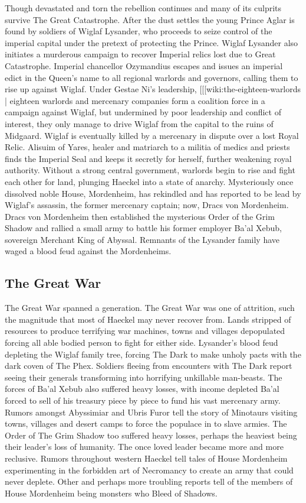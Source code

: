 \begin{multicols}{2}
Though devastated and torn the rebellion continues and many of its culprits survive The Great Catastrophe. After the dust settles the young Prince Aglar is found by soldiers of Wiglaf Lysander, who proceeds to seize control of the imperial capital under the pretext of protecting the Prince. Wiglaf Lysander also initiates a murderous campaign to recover Imperial relics lost due to Great Catastrophe. Imperial chancellor Ozymandius escapes and issues an imperial edict in the Queen's name to all regional warlords and governors, calling them to rise up against Wiglaf. Under Gestae Ni's leadership, [[[wiki:the-eighteen-warlords | eighteen warlords and mercenary companies form a coalition force in a campaign against Wiglaf, but undermined by poor leadership and conflict of interest, they only manage to drive Wiglaf from the capital to the ruins of Midgaard. Wiglaf is eventually killed by a mercenary in dispute over a lost Royal Relic. Alisuim of Yares, healer and matriarch to a militia of medics and priests finds the Imperial Seal and keeps it secretly for herself, further weakening royal authority. Without a strong central government, warlords begin to rise and fight each other for land, plunging Haeckel into a state of anarchy. Mysteriously once dissolved noble House, Mordenheim, has rekindled and has reported to be lead by Wiglaf's assassin, the former mercenary captain; now, Dracs von Mordenheim. Dracs von Mordenheim then established the mysterious Order of the Grim Shadow and rallied a small army to battle his former employer Ba'al Xebub, sovereign Merchant King of Abyssal. Remnants of the Lysander family have waged a blood feud against the Mordenheims.

\subsection{The Great War} The Great War spanned a generation. The Great War was one of attrition, such the magnitude that most of Haeckel may never recover from. Lands stripped of resources to produce terrifying war machines, towns and villages depopulated forcing all able bodied person to fight for either side. Lysander’s blood feud depleting the Wiglaf family tree, forcing The Dark to make unholy pacts with the dark coven of The Phex. Soldiers fleeing from encounters with The Dark report seeing their generals transforming into horrifying unkillable man-beasts. The forces of Ba’al Xebub also suffered heavy losses, with income depleted Ba’al forced to sell of his treasury piece by piece to fund his vast mercenary army. Rumors amongst Abyssimiar and Ubris Furor tell the story of Minotaurs visiting towns, villages and desert camps to force the populace in to slave armies. The Order of The Grim Shadow too suffered heavy losses, perhaps the heaviest being their leader’s loss of humanity. The once loved leader became more and more reclusive. Rumors throughout western Haeckel tell tales of House Mordenheim experimenting in the forbidden art of Necromancy to create an army that could never deplete. Other and perhaps more troubling reports tell of the members of House Mordenheim being monsters who Bleed of Shadows.


\end{multicols}
